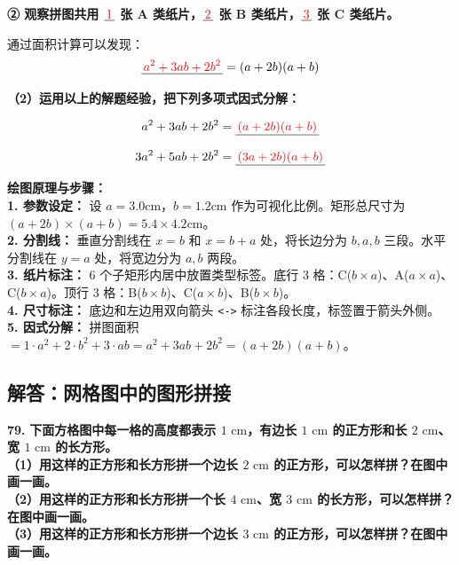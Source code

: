 \vspace{0.3cm}
\textbf{② 观察拼图共用 $\underline{\textcolor{red}{\,1\,}}$ 张 A 类纸片，$\underline{\textcolor{red}{\,2\,}}$ 张 B 类纸片，$\underline{\textcolor{red}{\,3\,}}$ 张 C 类纸片。}

通过面积计算可以发现：
$$\underline{\textcolor{red}{\,a^2 + 3ab + 2b^2\,}} = (a+2b)(a+b)$$

\vspace{0.3cm}
\textbf{（2）运用以上的解题经验，把下列多项式因式分解：}

$$a^2 + 3ab + 2b^2 = \underline{\textcolor{red}{\,(a+2b)(a+b)\,}}$$

$$3a^2 + 5ab + 2b^2 = \underline{\textcolor{red}{\,(3a+2b)(a+b)\,}}$$

\vspace{0.4cm}
{\small\color{blue!70!black}
\textbf{绘图原理与步骤：}\\
\textbf{1. 参数设定：} 设 $a = 3.0$cm，$b = 1.2$cm 作为可视化比例。矩形总尺寸为 $(a+2b) \times (a+b) = 5.4 \times 4.2$cm。\\
\textbf{2. 分割线：} 垂直分割线在 $x = b$ 和 $x = b + a$ 处，将长边分为 $b, a, b$ 三段。水平分割线在 $y = a$ 处，将宽边分为 $a, b$ 两段。\\
\textbf{3. 纸片标注：} 6 个子矩形内居中放置类型标签。底行 3 格：C($b \times a$)$、$A($a \times a$)$、$C($b \times a$)。顶行 3 格：B($b \times b$)$、$C($a \times b$)$、$B($b \times b$)。\\
\textbf{4. 尺寸标注：} 底边和左边用双向箭头 \texttt{<->} 标注各段长度，标签置于箭头外侧。\\
\textbf{5. 因式分解：} 拼图面积 $= 1 \cdot a^2 + 2 \cdot b^2 + 3 \cdot ab = a^2 + 3ab + 2b^2 = (a+2b)(a+b)$。
}

\newpage

\newpage

\subsection{解答：网格图中的图形拼接}

\vspace{0.6cm}

\textbf{\LARGE 79.} \textbf{下面方格图中每一格的高度都表示 $1\text{ cm}$，有边长 $1\text{ cm}$ 的正方形和长 $2\text{ cm}$、宽 $1\text{ cm}$ 的长方形。\\[1ex]
（1）用这样的正方形和长方形拼一个边长 $2\text{ cm}$ 的正方形，可以怎样拼？在图中画一画。\\[1ex]
（2）用这样的正方形和长方形拼一个长 $4\text{ cm}$、宽 $3\text{ cm}$ 的长方形，可以怎样拼？在图中画一画。\\[1ex]
（3）用这样的正方形和长方形拼一个边长 $3\text{ cm}$ 的正方形，可以怎样拼？在图中画一画。}

